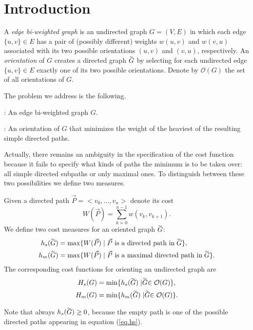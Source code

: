 \section{Introduction}

A \emph{edge bi-weighted graph} is an undirected graph $G = (V, E)$ in which each edge $\{u, v\} \in E$ has a pair of (possibly different) weights $w(u, v)$ and $w(v, u)$ associated with its two possible orientations $(u, v)$ and $(v, u)$, respectively. An \emph{orientation} 
of $G$ creates a directed graph $\tildeb{G}$ 
by selecting for each undirected edge $\{u, v\} \in E$ exactly one of its two possible orientations. Denote by $\mathcal{O}(G)$ the set of all orientations of $G$. 

The problem we address is the following.

: An edge bi-weighted graph $G$.

: An orientation  of $G$ that minimizes the weight of 
the heaviest of the resulting simple directed paths.

Actually, there remains an ambiguity in the specification of the cost function because it 
fails to specify what kinds of paths the minimum is to be taken over: all simple 
directed subpaths or only maximal ones. To distinguish between these two possibilities we define two measures.

\begin{definition}
	Given a directed path $ \vec{P}=<v_0,\ldots,v_n>$ denote its cost
	\begin{equation}\label{eq.W}
		W(\vec{P})=\sum_{k=0}^{n-1} w(v_k,v_{k+1}).
	\end{equation}
	We define two cost measures for an oriented graph $\tildeb{G}$:
	\begin{align} 
		h_s(\tildeb{G}) &= \max\{W(\vec{P})\mid \vec{P} \mbox{ is a directed path in}\tildeb{G} \},\label{eq.hs} \\
		h_m(\tildeb{G}) &= \max\{W(\vec{P})\mid \vec{P} \mbox{ is a maximal directed path in}
		\tildeb{G} \}.\label{eq.hm}
	\end{align}
	The corresponding cost functions for orienting an undirected graph are 
	\begin{align}
		H_s(G) &= \min\{h_s(\tildeb{G})\mid \tildeb{G} \in \mathcal{O}(G)\}, \\
		H_m(G) &= \min\{h_m(\tildeb{G})\mid \tildeb{G} \in \mathcal{O}(G)\}.
	\end{align}
\end{definition}
Note that always $h_s(\tildeb{G})\geq 0$, because the empty path is one of the possible 
directed paths appearing in equation (\ref{eq.hs}).

